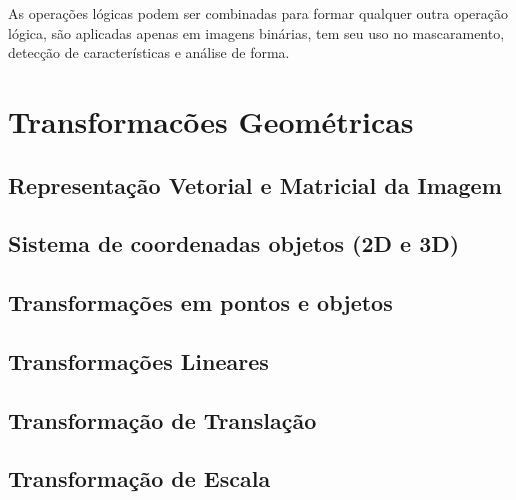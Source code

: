 \documentclass[
  brazilian,
]{book}
\begin{document}
As operações lógicas podem ser combinadas para formar qualquer outra operação lógica, são aplicadas apenas em imagens binárias, tem seu uso no mascaramento, detecção de características e análise de forma.

\hypertarget{transformacuxf5es-geomuxe9tricas}{%
\chapter{Transformacões Geométricas}\label{transformacuxf5es-geomuxe9tricas}}

\hypertarget{representauxe7uxe3o-vetorial-e-matricial-da-imagem}{%
\section{Representação Vetorial e Matricial da Imagem}\label{representauxe7uxe3o-vetorial-e-matricial-da-imagem}}

\hypertarget{sistema-de-coordenadas-objetos-2d-e-3d}{%
\section{Sistema de coordenadas objetos (2D e 3D)}\label{sistema-de-coordenadas-objetos-2d-e-3d}}

\hypertarget{transformauxe7uxf5es-em-pontos-e-objetos}{%
\section{Transformações em pontos e objetos}\label{transformauxe7uxf5es-em-pontos-e-objetos}}

\hypertarget{transformauxe7uxf5es-lineares}{%
\section{Transformações Lineares}\label{transformauxe7uxf5es-lineares}}

\hypertarget{transformauxe7uxe3o-de-translauxe7uxe3o}{%
\section{Transformação de Translação}\label{transformauxe7uxe3o-de-translauxe7uxe3o}}

\hypertarget{transformauxe7uxe3o-de-escala}{%
\section{Transformação de Escala}\label{transformauxe7uxe3o-de-escala}}
\end{document}
